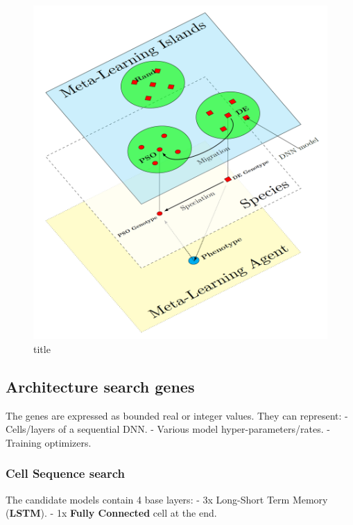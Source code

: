 \documentclass[11pt]{article}
\makeatletter
\def\maxwidth{\ifdim\Gin@nat@width>\linewidth\linewidth
    \else\Gin@nat@width\fi}
\let\Oldincludegraphics\includegraphics
\renewcommand{\includegraphics}[1]{\Oldincludegraphics[width=.8\maxwidth]{#1}}
\makeatother
\begin{document}
    \begin{figure}
\centering
\includegraphics{pics/agentIslandSpeciation.png}
\caption{title}
\end{figure}

    \hypertarget{architecture-search-genes}{%
\subsection{Architecture search genes}\label{architecture-search-genes}}

The genes are expressed as bounded real or integer values. They can
represent: - Cells/layers of a sequential DNN. - Various model
hyper-parameters/rates. - Training optimizers.

    \hypertarget{cell-sequence-search}{%
\subsubsection{Cell Sequence search}\label{cell-sequence-search}}

    The candidate models contain 4 base layers: - 3x Long-Short Term Memory
(\textbf{LSTM}). - 1x \textbf{Fully Connected} cell at the end.
\end{document}
